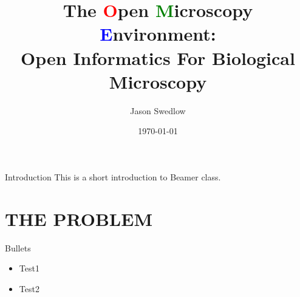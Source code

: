 \documentclass{beamer}
\title[OME]{The \textcolor{red}{O}pen \textcolor{green}{M}icroscopy \textcolor{blue}{E}nvironment:\\\small{Open Informatics For Biological Microscopy}}
\author{Jason Swedlow}
\date{\today}
\begin{document}
\ometitleframe



\begin{omeframe}{Introduction}
This is a short introduction to Beamer class.
\end{omeframe}

\section{THE PROBLEM}
\omesectionpage

\begin{glencoeframe}{Bullets}
    \begin{itemize}
        \item Test1
        \item Test2
    \end{itemize}
\end{glencoeframe}
\end{document}
